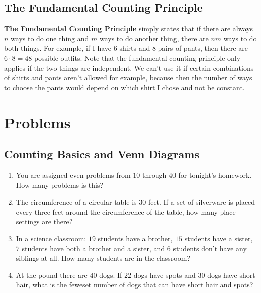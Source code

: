 \documentclass[twocolumn]{article}
\begin{document}
\subsection*{The Fundamental Counting Principle}
\textbf{The Fundamental Counting Principle} simply states that if there are 
always $n$ ways to do one thing and $m$ ways to do another thing, there are $nm$ 
ways to do both things. For example, if I have $6$ shirts and $8$ pairs of 
pants, then there are $6 \cdot 8 = 48$ possible outfits. Note that the 
fundamental counting principle only applies if the two things are independent.  
We can't use it if certain combinations of shirts and pants aren't allowed for 
example, because then the number of ways to choose the pants would depend on 
which shirt I chose and not be constant.

\section*{Problems}

\subsection*{Counting Basics and Venn Diagrams}
\begin{enumerate}
	\item You are assigned even problems from $10$ through $40$ for tonight's 
		homework. How many problems is this?
		\vspace{3cm}
	\item The circumference of a circular table is $30$ feet. If a set of 
		silverware is placed every three feet around the circumference of the 
		table, how many place-settings are there?
		\vspace{3cm}
	\item In a science classroom: $19$ students have a brother, $15$ students 
		have a sister, $7$ students have both a brother and a sister, and $6$ 
		students don't have any siblings at all. How many students are in the 
		classroom?
		\vspace{3cm}
	\item At the pound there are $40$ dogs. If $22$ dogs have spots and $30$ 
		dogs have short hair, what is the feweset number of dogs that can have 
		short hair and spots?
		\vspace{3cm}
\end{enumerate}
\end{document}
